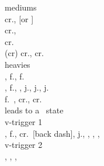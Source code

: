 \documentclass[a4paper,9pt,twocolumn]{letter}
\begin{document}
\smallbreak
\noindent
mediums \\
cr.\mkick\cancel\qcb\lkick, [\lkick or \mkick] \\
cr.\mkick\cancel\qcb\exkick,\dragonpunch\hkick \\
cr.\mkick\cancel\dragonpunch\hkick \\
(cr) cr.\mkick\cancel\qcb\mpunch, cr.\lpunch\cancel\dragonpunch\hkick \\

\vfill\eject
\noindent
heavies \\
\hpunch, f.\hpunch, f.\hpunch\cancel\vsone \\
\hpunch, f.\hpunch\cancel\vstwo, \up, j.\mpunch, j.\hpunch, j.\hkick\cancel\qcf\expunch \\
f.\hpunch\ \crush, cr.\mpunch\cancel\qcb\mpunch, cr.\lpunch\cancel\dragonpunch\hkick \\
\vsone\air\qcf\anypunch leads to a \crush\ state \\

\smallbreak
\noindent
v-trigger 1 \\
\hpunch, f.\hpunch\cancel\vtone, cr.\hpunch\ [back dash], j.\hkick, \qcb\hkick, \hkick, \qcb\expunch, \dragonpunch\exkick \\
v-trigger 2 \\
\hkick\cancel\vttwo\cancel\anykick, \anypunch, \anykick, \qcb\expunch \\
\end{document}
